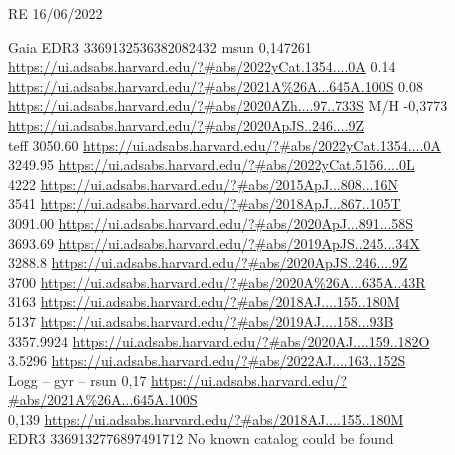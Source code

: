 RE 16/06/2022

Gaia EDR3 3369132536382082432 
msun 
0,147261 \url{https://ui.adsabs.harvard.edu/?#abs/2022yCat.1354....0A}
0.14   \url{https://ui.adsabs.harvard.edu/?#abs/2021A%26A...645A.100S}
0.08 \url{https://ui.adsabs.harvard.edu/?#abs/2020AZh....97..733S}
M/H
-0,3773	\url{https://ui.adsabs.harvard.edu/?#abs/2020ApJS..246....9Z}\\
teff 
3050.60 \url{https://ui.adsabs.harvard.edu/?#abs/2022yCat.1354....0A}\\
3249.95  \url{https://ui.adsabs.harvard.edu/?#abs/2022yCat.5156....0L}\\
4222  \url{https://ui.adsabs.harvard.edu/?#abs/2015ApJ...808...16N}\\
3541  \url{https://ui.adsabs.harvard.edu/?#abs/2018ApJ...867..105T}\\
3091.00 \url{https://ui.adsabs.harvard.edu/?#abs/2020ApJ...891...58S}\\
3693.69 \url{https://ui.adsabs.harvard.edu/?#abs/2019ApJS..245...34X}\\
3288.8 \url{https://ui.adsabs.harvard.edu/?#abs/2020ApJS..246....9Z}\\
3700  \url{https://ui.adsabs.harvard.edu/?#abs/2020A%26A...635A..43R}\\
3163  \url{https://ui.adsabs.harvard.edu/?#abs/2018AJ....155..180M}\\
5137 \url{https://ui.adsabs.harvard.edu/?#abs/2019AJ....158...93B}\\
3357.9924 \url{https://ui.adsabs.harvard.edu/?#abs/2020AJ....159..182O}\\
3.5296 \url{https://ui.adsabs.harvard.edu/?#abs/2022AJ....163..152S}\\
Logg
--
gyr 
--
rsun
0,17  \url{https://ui.adsabs.harvard.edu/?#abs/2021A%26A...645A.100S}\\
0,139  \url{https://ui.adsabs.harvard.edu/?#abs/2018AJ....155..180M }\\

EDR3 3369132776897491712
 No known catalog could be found